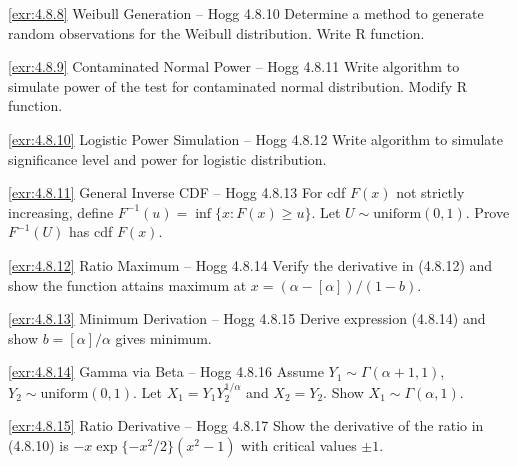 \begin{exercise}{\ref{exr:4.8.8} Weibull Generation – Hogg 4.8.10}\label{exr:4.8.8}
Determine a method to generate random observations for the Weibull distribution. Write R function.
\end{exercise}

\begin{exercise}{\ref{exr:4.8.9} Contaminated Normal Power – Hogg 4.8.11}\label{exr:4.8.9}
Write algorithm to simulate power of the test for contaminated normal distribution. Modify R function.
\end{exercise}

\begin{exercise}{\ref{exr:4.8.10} Logistic Power Simulation – Hogg 4.8.12}\label{exr:4.8.10}
Write algorithm to simulate significance level and power for logistic distribution.
\end{exercise}

\begin{exercise}{\ref{exr:4.8.11} General Inverse CDF – Hogg 4.8.13}\label{exr:4.8.11}
For cdf $F(x)$ not strictly increasing, define $F^{-1}(u)=\inf\{x: F(x) \geq u\}$. Let $U \sim \text{uniform}(0,1)$. Prove $F^{-1}(U)$ has cdf $F(x)$.
\end{exercise}

\begin{exercise}{\ref{exr:4.8.12} Ratio Maximum – Hogg 4.8.14}\label{exr:4.8.12}
Verify the derivative in (4.8.12) and show the function attains maximum at $x=(\alpha-[\alpha])/(1-b)$.
\end{exercise}

\begin{exercise}{\ref{exr:4.8.13} Minimum Derivation – Hogg 4.8.15}\label{exr:4.8.13}
Derive expression (4.8.14) and show $b=[\alpha]/\alpha$ gives minimum.
\end{exercise}

\begin{exercise}{\ref{exr:4.8.14} Gamma via Beta – Hogg 4.8.16}\label{exr:4.8.14}
Assume $Y_1 \sim \Gamma(\alpha+1,1)$, $Y_2 \sim \text{uniform}(0,1)$. Let $X_1=Y_1 Y_2^{1/\alpha}$ and $X_2=Y_2$. Show $X_1 \sim \Gamma(\alpha,1)$.
\end{exercise}

\begin{exercise}{\ref{exr:4.8.15} Ratio Derivative – Hogg 4.8.17}\label{exr:4.8.15}
Show the derivative of the ratio in (4.8.10) is $-x\exp\{-x^2/2\}(x^2-1)$ with critical values $\pm 1$.
\end{exercise}

